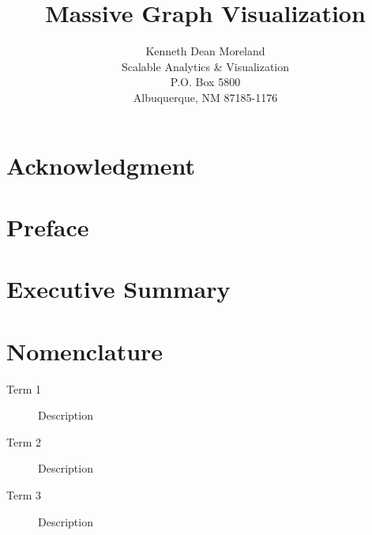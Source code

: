 \documentclass[pdf,12pt,report,strict]{SANDreport}
\title{Massive Graph Visualization}
\author{Kenneth Dean Moreland\\
Scalable Analytics \& Visualization\\
P.O. Box 5800\\
Albuquerque, NM 87185-1176}		%
\date{}					%
\begin{document}
\maketitle

% 
\begin{abstract}
\end{abstract}


% 
\clearpage
\chapter*{Acknowledgment}


% 
\cleardoublepage		%
\tableofcontents
\listoffigures
\listoftables


\clearpage
\chapter*{Preface}


\clearpage
\chapter*{Executive Summary}


\clearpage
\chapter*{Nomenclature}
\begin{description}
\item[Term 1]
  Description
\item[Term 2]
  Description
\item[Term 3]
  Description
\end{description}
\end{document}
